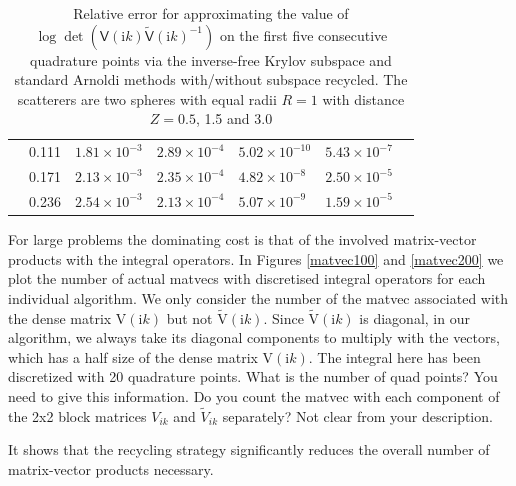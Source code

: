 \begin{table}[H]
\begin{tabular}{ |M{1.5cm}|M{1.7cm}|M{2.2cm} |M{2.2cm}|M{2.2cm}|M{3cm}|M{2.2cm}| }
                                   & 0.111    & $1.81\times 10^{-3}$  & $2.89\times 10^{-4}$  &$5.02\times 10^{-10}$ &$5.43\times 10^{-7}$\\ 
                                   & 0.171    & $2.13\times 10^{-3}$  & $2.35\times 10^{-4}$  &$4.82\times 10^{-8}$  &$2.50\times 10^{-5}$\\ 
                                   & 0.236    & $2.54\times 10^{-3}$  & $2.13\times 10^{-4}$  &$5.07\times 10^{-9}$  &$1.59\times 10^{-5}$\\ 
    \hline
    \end{tabular}
    \caption{Relative error for approximating the value of $\log\det(\mathsf{V}(\mathrm{i}k)\tilde{\mathsf{V}}(\mathrm{i}k)^{-1})$ on the first five consecutive 
    quadrature points via the inverse-free Krylov subspace and standard Arnoldi methods with/without subspace recycled. The scatterers are two spheres with 
    equal radii $R = 1$ with distance $Z = 0.5$, 1.5 and 3.0}
    \label{Table lists the logdet}
    \end{table}
    
For large problems the dominating cost is that of the involved matrix-vector products with the integral operators. In Figures \ref{matvec100} and \ref{matvec200} we
plot the number of actual matvecs with discretised integral operators for each individual algorithm. {\color{teal} We only consider the number of the matvec associated with the dense matrix 
$\mathrm{V}(\mathrm{i}k)$ but not $\tilde{\mathrm{V}}(\mathrm{i}k)$. Since $\tilde{\mathrm{V}}(\mathrm{i}k)$ is diagonal, in our algorithm, we always take its diagonal 
components to multiply with the vectors, which has a half size of the dense matrix $\mathrm{V}(\mathrm{i}k)$.} The integral here has been discretized with {\color {teal} 20} quadrature
points. {\color{red} What is the number of quad points? You need to give this information.} {\color{red} Do you count the matvec with each component of the
2x2 block matrices $V_{ik}$ and $\tilde{V}_{ik}$ separately? Not clear from your description.} 

It shows that the recycling strategy significantly reduces the overall number of matrix-vector products necessary.


